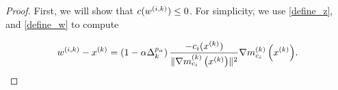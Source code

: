 \begin{proof}
First, we will show that $c({w^{(i, k)}}) \le 0$.
For simplicity, we use \cref{define_z}, and \cref{define_w} to compute


\begin{align}
{w^{(i, k)}} - x^{(k)} = \left(1 - \alpha \Delta_k^{p_{\alpha} }\right)\frac{-c_i(x^{(k)})}{\|{\nabla m_{c_i}^{(k)}\left(x^{(k)}\right)}\|^2}{\nabla m_{c_i}^{(k)}\left(x^{(k)}\right)}. \label{simple_computation}
\end{align}


\end{proof}

